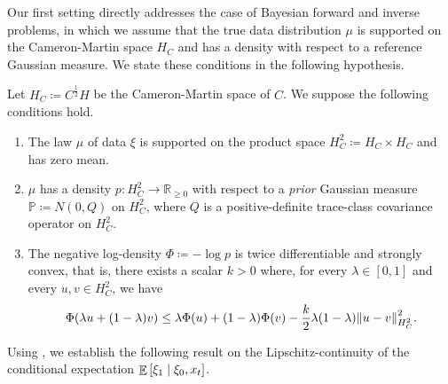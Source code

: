 Our first setting directly addresses the case of Bayesian forward and inverse problems, in which we assume that the true data distribution \(\mu\) is supported on the Cameron-Martin space \(H_{C}\) and has a density with respect to a reference Gaussian measure. We state these conditions in the following hypothesis.
\begin{definitionbox}
  \begin{hypothesis}\label{hyp:bayes}
    Let \(H_{C} \coloneqq C^{\frac{1}{2}}H\) be the Cameron-Martin space of \(C\). We suppose the following conditions hold.
    \begin{enumerate}[label=\roman*]
      \item \label{hyp1.1} The law \(\mu\) of data \(\xi\) is supported on the product space \(H_{C}^{2} \coloneqq H_{C} \times H_{C} \) and has zero mean.
      \item \label{hyp1.2} \(\mu\) has a density \(p : H^{2}_{C} \to \mathbb{R}_{\geq 0}\) with respect to a \textit{prior} Gaussian measure \(\mathbb{P} \coloneqq N(0, Q)\) on \(H^{2}_{C}\), where \(Q\) is a positive-definite trace-class covariance operator on \(H_{C}^{2}\).
      \item \label{hyp1.3} The negative log-density \(\Phi \coloneqq - \log p\) is twice differentiable and strongly convex, that is, there exists a scalar \(k > 0\) where, for every \(\lambda \in [0, 1]\) and every \(u, v \in H^{2}_{C}\), we have
        \[
          \Phi(\lambda u + (1 - \lambda)v) \leq \lambda \Phi(u) + (1 - \lambda) \Phi(v) - \frac{k}{2}\lambda(1-\lambda) \norm{u - v}^{2}_{H^{2}_{C}}.
        \]
    \end{enumerate}
  \end{hypothesis}
\end{definitionbox}

Using , we establish the following result on the Lipschitz-continuity of the conditional expectation \(\mathop{\mathbb{E}}\qty[ \xi_{1} \mid \xi_{0}, x_{t}]\).

